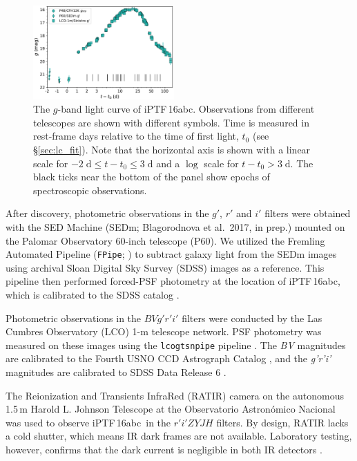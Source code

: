 \documentclass[twocolumn]{aastex61}
\newcommand{\abc}{iPTF\,16abc}
\begin{document}
\begin{figure}[htb]
  \centering
  \includegraphics[width=0.48\textwidth]{logLC_with_colors.pdf}
  \caption{The $g$-band
  light curve of \abc. Observations from different 
  telescopes are shown with different symbols. Time is measured in 
  rest-frame days relative to the time of first light, $t_0$ (see 
  \S\ref{sec:lc_fit}). Note that the horizontal axis is shown with 
  a linear scale for $-2 \; \mathrm{d} \le t - t_0 \le 3 \; 
  \mathrm{d}$ and a $\log$ scale for $t - t_0 > 3 \; \mathrm{d}$. 
  The black ticks near the
  bottom of the panel show epochs of spectroscopic observations.
  }
  \label{fig:lightcurve}
\end{figure}

After discovery, photometric observations in the $g'$, $r'$ and $i'$
filters were obtained with the SED Machine 
(SEDm; Blagorodnova et al.\ 2017, in prep.) mounted on the Palomar Observatory 
60-inch telescope (P60). We utilized the Fremling Automated Pipeline (\texttt{FPipe}; \citealt{2016A&A...593A..68F}) to subtract galaxy light from the SEDm images using archival Sloan Digital Sky Survey (SDSS) images as a reference. This pipeline then performed forced-PSF photometry at the location of \abc, which is calibrated to the SDSS catalog \citep{2014ApJS..211...17A}.

Photometric observations in the $BVg'r'i'$ filters were conducted by the Las Cumbres Observatory (LCO) 1-m
telescope network.  PSF photometry was measured on these images using
the \texttt{lcogtsnpipe} pipeline \citep{2016MNRAS.459.3939V}. The
\textit{BV} magnitudes are calibrated to the Fourth USNO CCD
Astrograph Catalog \citep{2013AJ....145...44Z}, and the \textit{g'r'i'}
magnitudes are calibrated to SDSS Data Release 6
\citep{2008ApJS..175..297A}.

The Reionization and Transients InfraRed (RATIR) camera on the autonomous 1.5\,m Harold L. Johnson Telescope at the Observatorio Astron\'{o}mico Nacional \citep{2012SPIE.8446E..10B,2012SPIE.8444E..5LW} was used to observe \abc\ in the $r'i'ZYJH$ filters. By design, RATIR lacks a cold shutter, which means IR dark frames are not available. Laboratory testing, however, confirms that the dark current is negligible in both IR detectors \citep{2012SPIE.8453E..1OF}.
\end{document}
